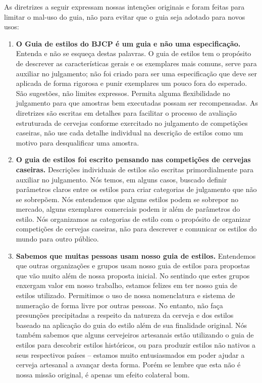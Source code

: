 As diretrizes a seguir expressam nossas intenções originais e foram feitas para limitar o mal-uso do guia, não para evitar que o guia seja adotado para novos usos:
\begin{enumerate}
\item \textbf{O Guia de estilos do BJCP é um guia e não uma especificação.} Entenda e não se esqueça destas palavras. O guia de estilos tem o propósito de descrever as características gerais e os exemplares mais comuns, serve para auxiliar no julgamento; não foi criado para ser uma especificação que deve ser aplicada de forma rigorosa e punir exemplares um pouco fora do esperado. São sugestões, não limites expressos. Permita alguma flexibilidade no julgamento para que amostras bem executadas possam ser recompensadas. As diretrizes são escritas em detalhes para facilitar o processo de avaliação estruturada de cervejas conforme exercitado no julgamento de competições caseiras, não use cada detalhe individual na descrição de estilos como um motivo para desqualificar uma amostra.
\item \textbf{O guia de estilos foi escrito pensando nas competições de cervejas caseiras.} Descrições individuais de estilos são escritas primordialmente para auxiliar no julgamento. Nós temos, em alguns casos, buscado definir parâmetros claros entre os estilos para criar categorias de julgamento que não se sobrepõem. Nós entendemos que alguns estilos podem se sobrepor no mercado, alguns exemplares comerciais podem ir além de parâmetros do estilo. Nós organizamos as categorias de estilo com o propósito de organizar competições de cervejas caseiras, não para descrever e comunicar os estilos do mundo para outro público.
\item \textbf{Sabemos que muitas pessoas usam nosso guia de estilos.} Entendemos que outras organizações e grupos usam nosso guia de estilos para propostas que vão muito além de nossa proposta inicial. No sentindo que estes grupos enxergam valor em nosso trabalho, estamos felizes em ter nosso guia de estilos utilizado. Permitimos o uso de nossa nomenclatura e sistema de numeração de forma livre por outras pessoas. No entanto, não faça presunções precipitadas a respeito da natureza da cerveja e dos estilos baseado na aplicação do guia do estilo além de sua finalidade original. Nós também sabemos que alguns cervejeiros artesanais estão utilizando o guia de estilos para descobrir estilos históricos, ou para produzir estilos não nativos a seus respectivos países – estamos muito entusiasmados em poder ajudar a cerveja artesanal a avançar desta forma. Porém se lembre que esta não é nossa missão original, é apenas um efeito colateral bom.

\end{enumerate}
